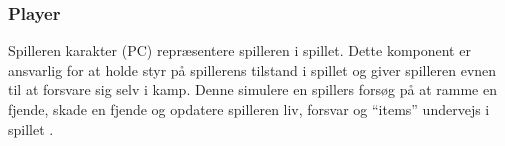 \subsubsection{Player}
Spilleren karakter (PC) repræsentere spilleren i spillet. Dette komponent er ansvarlig for at
holde styr på spillerens tilstand i spillet og giver spilleren evnen til at forsvare
sig selv i kamp. Denne simulere en spillers forsøg på at ramme en fjende, skade en 
fjende og opdatere spilleren liv, forsvar og ``items'' undervejs i spillet 
\parencite[Section 13.3.2][]{TekniskBilag}.


\newpage
